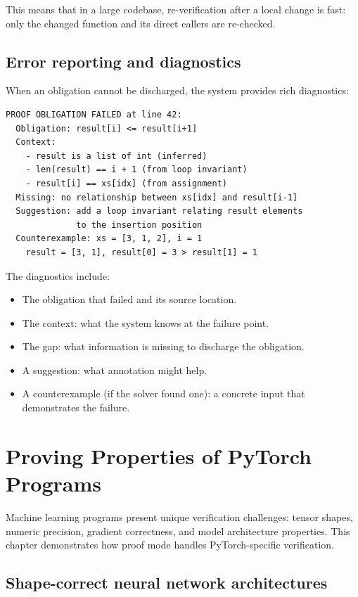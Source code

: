 \documentclass[11pt]{report}
\theoremstyle{definition}
\theoremstyle{plain}
\begin{document}
This means that in a large codebase, re-verification after a local change is
fast: only the changed function and its direct callers are re-checked.

\section{Error reporting and diagnostics}

When an obligation cannot be discharged, the system provides rich diagnostics:

\begin{lstlisting}[language={}]
PROOF OBLIGATION FAILED at line 42:
  Obligation: result[i] <= result[i+1]
  Context:
    - result is a list of int (inferred)
    - len(result) == i + 1 (from loop invariant)
    - result[i] == xs[idx] (from assignment)
  Missing: no relationship between xs[idx] and result[i-1]
  Suggestion: add a loop invariant relating result elements
              to the insertion position
  Counterexample: xs = [3, 1, 2], i = 1
    result = [3, 1], result[0] = 3 > result[1] = 1
\end{lstlisting}

The diagnostics include:
\begin{itemize}[nosep]
  \item The obligation that failed and its source location.
  \item The context: what the system knows at the failure point.
  \item The gap: what information is missing to discharge the obligation.
  \item A suggestion: what annotation might help.
  \item A counterexample (if the solver found one): a concrete input that
        demonstrates the failure.
\end{itemize}


\chapter{Proving Properties of PyTorch Programs}

Machine learning programs present unique verification challenges: tensor
shapes, numeric precision, gradient correctness, and model architecture
properties. This chapter demonstrates how proof mode handles PyTorch-specific
verification.

\section{Shape-correct neural network architectures}
\end{document}
